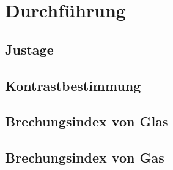 \section{Durchführung}
\label{sec:Durchführung}

\subsection{Justage}

\subsection{Kontrastbestimmung}

\subsection{Brechungsindex von Glas}

\subsection{Brechungsindex von Gas}
